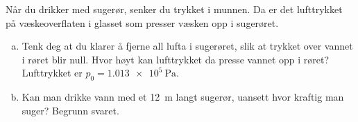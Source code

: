 %
Når du drikker med sugerør, senker du trykket i munnen. Da er det lufttrykket på væskeoverflaten i glasset som presser væsken opp i sugerøret.
\begin{enumerate}[a)]
    \item Tenk deg at du klarer å fjerne all lufta i sugerøret, slik at trykket over vannet i røret blir null. Hvor høyt kan lufttrykket da presse vannet opp i røret? Lufttrykket er $p_0 = \SI{1.013e5}{\pascal}$.
    \item Kan man drikke vann med et \SI{12}{\metre} langt sugerør, uansett hvor kraftig man suger? Begrunn svaret.
\end{enumerate}
%
